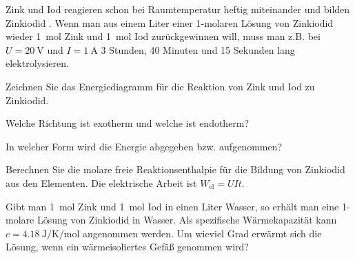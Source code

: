 \documentclass[ahaeffekt]{exercise}
\begin{document}
Zink und Iod reagieren schon bei Raumtemperatur heftig miteinander und bilden Zink\-iodid . Wenn man aus einem Liter einer 1-molaren Lösung von Zinkiodid wieder \SI{1}{\mole} Zink und \SI{1}{\mole} Iod zurückgewinnen will, muss man z.B. bei $U = \SI{20}{\volt}$ und $I = \SI{1}{\ampere}$ 3 Stunden, 40 Minuten und 15 Sekunden lang elektrolysieren.
\begin{alphlist}
 \item Zeichnen Sie das Energiediagramm für die Reaktion von Zink und Iod zu Zink\-iodid.
 \item Welche Richtung ist exotherm und welche ist endotherm?
 \item In welcher Form wird die Energie abgegeben bzw. aufgenommen?
 \item Berechnen Sie die molare freie Reaktionsenthalpie für die Bildung von Zinkiodid aus den Elementen. Die elektrische Arbeit ist $W_\text{el} = U I t$.
 \item Gibt man \SI{1}{\mole} Zink und \SI{1}{\mole} Iod in einen Liter Wasser, so erhält man eine 1-molare Lösung von Zinkiodid in Wasser. Als spezifische Wärmekapazität kann $c = \SI{4.18}{\joule\per\kelvin\per\mole}$ angenommen werden. Um wieviel Grad erwärmt sich die Lösung, wenn ein wärmeisoliertes Gefäß genommen wird?
\end{alphlist}
\end{document}
